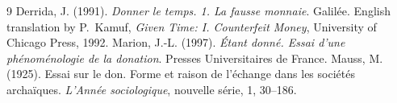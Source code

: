 \documentclass{situationist-preprint}
\begin{document}
\begin{thebibliography}{9}\small
{} Derrida, J. (1991). \emph{Donner le temps. 1. La fausse monnaie}. Galilée. English translation by P.~Kamuf, \emph{Given Time: I. Counterfeit Money}, University of Chicago Press, 1992.
 Marion, J.-L. (1997). \emph{Étant donné. Essai d'une phénoménologie de la donation}. Presses Universitaires de France.
 Mauss, M. (1925). Essai sur le don. Forme et raison de l'échange dans les sociétés archaïques. \emph{L'Année sociologique}, nouvelle série, 1, 30--186.
\end{thebibliography}
\end{document}
